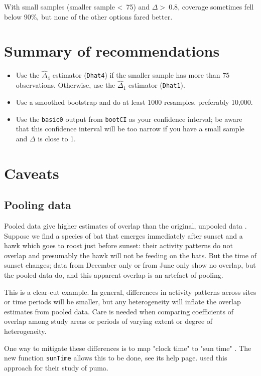 \documentclass[a4paper]{article}
\begin{document}
With small samples (smaller sample <~75) and $\Delta >~0.8$, coverage sometimes fell below 90\%, but none of the other options fared better.


\section{Summary of recommendations}
\label{sec:summary}

\begin{itemize}
  \item Use the $\hat{\Delta}_4$ estimator (\texttt{Dhat4}) if the smaller sample has more than 75 observations. Otherwise, use the $\hat{\Delta}_1$ estimator (\texttt{Dhat1}).
  \item Use a smoothed bootstrap and do at least 1000 resamples, preferably 10,000.
  \item Use the \texttt{basic0} output from \texttt{bootCI} as your confidence interval; be aware that this confidence interval will be too narrow if you have a small sample and $\Delta$ is close to 1.
\end{itemize}


\section{Caveats}
\label{sec:caveats}

\subsection{Pooling data}
\label{sec:pooling}

Pooled data give higher estimates of overlap than the original, unpooled data \citep{RidoutLinkie2009}. Suppose we find a species of bat that emerges immediately after sunset and a hawk which goes to roost just before sunset: their activity patterns do not overlap and presumably the hawk will not be feeding on the bats. But the time of sunset changes; data from December only or from June only show no overlap, but the pooled data do, and this apparent overlap is an artefact of pooling.

This is a clear-cut example. In general, differences in activity patterns across sites or time periods will be smaller, but any heterogeneity will inflate the overlap estimates from pooled data. Care is needed when comparing coefficients of overlap among study areas or periods of varying extent or degree of heterogeneity.

One way to mitigate these differences is to map "clock time" to "sun time" \citep{Nouvellet+2012}. The new function \texttt{sunTime} allows this to be done, see its help page. \citet{Azevedo+2018} used this approach for their study of puma.
\end{document}
